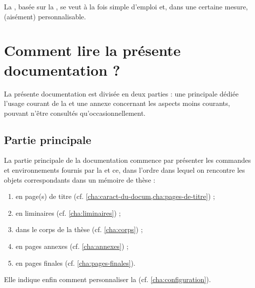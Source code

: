La \yatcl{}, basée sur la , se veut à la fois simple d'emploi et,
dans une certaine mesure, (aisément) personnalisable.


\section{Comment lire la présente documentation ?}
\label{sec:comment-lire-cette}

La présente documentation est divisée en deux parties : une principale dédiée
l'usage courant de la \yatcl{} et une annexe concernant les aspects moins
courants, pouvant n'être consultés qu'occasionnellement.

\subsection{Partie principale}
\label{sec:partie-principale}

La partie principale de la documentation commence par présenter les commandes
et environnements fournis par la \yatcl{} et ce, dans l'ordre dans lequel on
rencontre les objets correspondants dans un mémoire de thèse :
\begin{enumerate}
\item en page(s) de titre (cf. \vref{cha:caract-du-docum,cha:pages-de-titre}) ;
\item en \glspl{liminaire} (cf. \vref{cha:liminaires}) ;
\item dans le corps de la thèse (cf. \vref{cha:corps}) ;
\item en pages annexes (cf. \vref{cha:annexes}) ;
\item en pages finales (cf. \vref{cha:pages-finales}).
\end{enumerate}
Elle indique enfin comment personnaliser la \yatcl{}
(cf. \vref{cha:configuration}).

